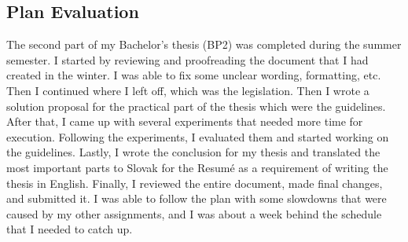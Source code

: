 \subsection*{Plan Evaluation}
The second part of my Bachelor's thesis (BP2) was completed during the summer semester. I started by reviewing and proofreading the document that I had created in the winter. I was able to fix some unclear wording, formatting, etc. Then I continued where I left off, which was the legislation. Then I wrote a solution proposal for the practical part of the thesis which were the guidelines. After that, I came up with several experiments that needed more time for execution. Following the experiments, I evaluated them and started working on the guidelines. Lastly, I wrote the conclusion for my thesis and translated the most important parts to Slovak for the Resumé as a requirement of writing the thesis in English. Finally, I reviewed the entire document, made final changes, and submitted it.
I was able to follow the plan with some slowdowns that were caused by my other assignments, and I was about a week behind the schedule that I needed to catch up.
